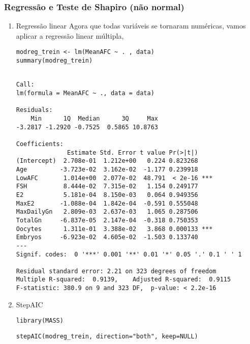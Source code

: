 \documentclass[11pt]{article}
\begin{document}
\subsubsection{Regressão e Teste de Shapiro (não normal)}
\label{sec:orgba78091}
\begin{enumerate}
\item Regressão linear
\label{sec:org606f159}
Agora que todas variáveis se tornaram numéricas, vamos aplicar a regressão linear múltipla,

\begin{verbatim}
modreg_trein <- lm(MeanAFC ~ . , data)
summary(modreg_trein)
\end{verbatim}

\begin{verbatim}

Call:
lm(formula = MeanAFC ~ ., data = data)

Residuals:
    Min      1Q  Median      3Q     Max 
-3.2817 -1.2920 -0.7525  0.5865 10.8763 

Coefficients:
              Estimate Std. Error t value Pr(>|t|)    
(Intercept)  2.708e-01  1.212e+00   0.224 0.823268    
Age         -3.723e-02  3.162e-02  -1.177 0.239918    
LowAFC       1.014e+00  2.077e-02  48.791  < 2e-16 ***
FSH          8.444e-02  7.315e-02   1.154 0.249177    
E2           5.181e-04  8.150e-03   0.064 0.949356    
MaxE2       -1.088e-04  1.842e-04  -0.591 0.555048    
MaxDailyGn   2.809e-03  2.637e-03   1.065 0.287506    
TotalGn     -6.837e-05  2.147e-04  -0.318 0.750353    
Oocytes      1.311e-01  3.388e-02   3.868 0.000133 ***
Embryos     -6.923e-02  4.605e-02  -1.503 0.133740    
---
Signif. codes:  0 '***' 0.001 '**' 0.01 '*' 0.05 '.' 0.1 ' ' 1

Residual standard error: 2.21 on 323 degrees of freedom
Multiple R-squared:  0.9139,	Adjusted R-squared:  0.9115 
F-statistic: 380.9 on 9 and 323 DF,  p-value: < 2.2e-16

\end{verbatim}

\item StepAIC
\label{sec:org6495564}
\begin{verbatim}
library(MASS)
\end{verbatim}

\begin{verbatim}
stepAIC(modreg_trein, direction="both", keep=NULL)
\end{verbatim}


\end{enumerate}
\end{document}
